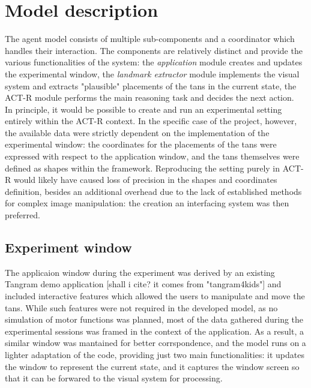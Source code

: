 \documentclass[a4paper,singleside,12pt]{report} %
\begin{document}
	
	\chapter{Model description}
    
	The agent model consists of multiple sub-components and a coordinator which handles their
	interaction. The components are relatively distinct and provide the various functionalities of
	the system: the \textit{application} module creates and updates the experimental window, the
	\textit{landmark extractor} module implements the visual system and extracts "plausible" placements
	of the tans in the current state, the ACT-R module performs the main reasoning task and decides
	the next action.\\
    In principle, it would be possible to create and run an experimental setting entirely within the ACT-R
	context. In the specific case of the project, however, the available data were strictly
	dependent on the implementation of the experimental window: the coordinates for the placements
	of the tans were expressed with respect to the application window, and the tans themselves were
	defined as shapes within the framework. Reproducing the setting purely in ACT-R would likely
	have caused loss of precision in the shapes and coordinates definition, besides an additional
	overhead due to the lack of established methods for complex image manipulation: the creation an
	interfacing system was then preferred.\\
    
    \section{Experiment window}
	The applicaion window during the experiment was derived by an existing Tangram demo application
	[shall i cite? it comes from "tangram4kids"] and included interactive features which allowed the
	users to manipulate and move the tans. While such features were not required in the developed
	model, as no simulation of motor functions was planned, most of the data gathered during the
	experimental sessions was framed in the context of the application. As a result, a similar
	window was mantained for better corrspondence, and the model runs on a lighter adaptation of the
	code, providing just two main functionalities: it updates the window to represent the current state, and it
	captures the window screen so that it can be forwared to the visual system for processing.
\end{document}
